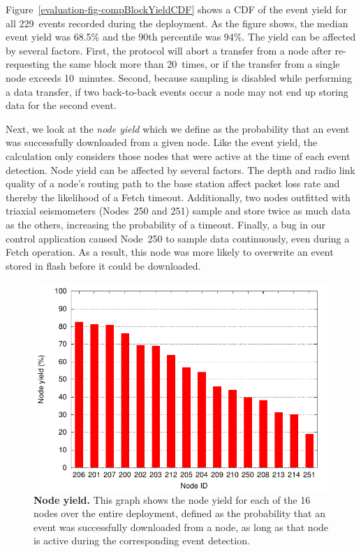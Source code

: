 Figure~\ref{evaluation-fig-compBlockYieldCDF} shows a CDF of the event yield
for all 229~events recorded during the deployment. As the figure shows, the
median event yield was 68.5\% and the 90th percentile was 94\%. The yield can
be affected by several factors. First, the protocol will abort a transfer
from a node after re-requesting the same block more than 20~times, or if the
transfer from a single node exceeds 10~minutes. Second, because sampling is
disabled while performing a data transfer, if two back-to-back events occur a
node may not end up storing data for the second event.

Next, we look at the \textit{node yield} which we define as the probability
that an event was successfully downloaded from a given node. Like the event
yield, the calculation only considers those nodes that were active at the
time of each event detection. Node yield can be affected by several factors.
The depth and radio link quality of a node's routing path to the base station
affect packet loss rate and thereby the likelihood of a Fetch timeout.
Additionally, two nodes outfitted with triaxial seismometers (Nodes~250 and
251) sample and store twice as much data as the others, increasing the
probability of a timeout. Finally, a bug in our control application caused
Node~250 to sample data continuously, even during a Fetch operation. As a
result, this node was more likely to overwrite an event stored in flash
before it could be downloaded.

\begin{figure}[t]
\begin{center}
\includegraphics[width=\hsize]{./5-evaluation/figs/performance/yields/nodeYield/nodeYieldOnly.pdf}
\end{center}
\caption{\textbf{Node yield.}
This graph shows the node yield for each of the 16 nodes over the entire
deployment, defined as the probability that an event was successfully
downloaded from a node, as long as that node is active during the
corresponding event detection.}
\label{evaluation-fig-nodeYield}
\end{figure}

